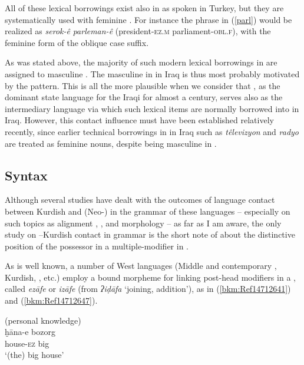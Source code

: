 \documentclass[output=paper]{langsci/langscibook}
\begin{document}
All of these lexical borrowings exist also in  as spoken in Turkey, but they are systematically used with feminine . For instance the phrase in (\ref{parl}) would be realized as \textit{serok-ê} \textit{parleman-ê} (president-\textsc{ez.m} parliament-\textsc{obl.f}), with the feminine form of the oblique case suffix. 

As was stated above, the majority of such modern lexical borrowings in  are assigned to masculine . The masculine  in  in Iraq is thus most probably motivated by the   pattern. This is all the more plausible when we consider that , as the dominant state language for the Iraqi  for almost a century, serves also as the intermediary language via which such lexical items are normally borrowed into  in Iraq. However, this contact influence must have been established relatively recently, since earlier technical borrowings in  in Iraq such as \textit{têlevizyon} and \textit{radyo} are treated as feminine nouns, despite being masculine in .  

\subsection{\label{bkm:Ref520275931} Syntax}

Although several studies have dealt with the outcomes of language contact between Kurdish and (Neo-) in the grammar of these languages – especially on such topics as alignment \citep{Coghill2016},  \citep{Haig2014}, and  morphology \citep{Noorlander2014} – as far as I am aware, the only study on –Kurdish contact in grammar is the short note of \citet{Tsabolov1994} about the distinctive position of the possessor in a multiple-modifier  in . 

As is well known, a number of West  languages (Middle and contemporary , Kurdish, , etc.) employ a bound morpheme for linking post-head modifiers in a , called \textit{ezāfe} or \textit{izāfe} (from  \textit{ʔiḍāfa} ‘joining, addition’), as in (\ref{bkm:Ref14712641}) and (\ref{bkm:Ref14712647}). 

\ea\label{bkm:Ref14712641} (personal knowledge)\\
\gll ḫāna-e bozorg\\
     house-\textsc{ez} big\\
\glt ‘(the) big house’
\z
\end{document}
